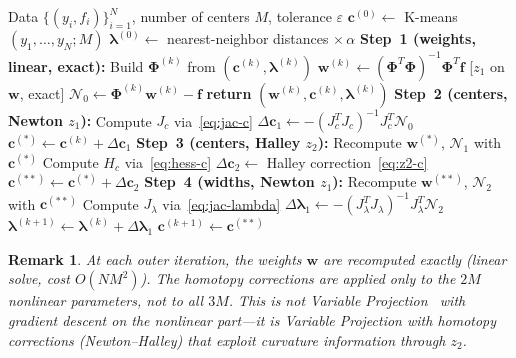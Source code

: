 \documentclass[11pt,a4paper]{article}
\newtheorem{remark}[theorem]{Remark}
\begin{document}
\begin{algorithm}[H]
\caption{HAM-RBF Identification}
\label{alg:identification}
\begin{algorithmic}[1]
\REQUIRE Data $\{(y_i, f_i)\}_{i=1}^N$, number of centers $M$, tolerance $\varepsilon$
\STATE $\mathbf{c}^{(0)} \leftarrow$ K-means$(y_1,\ldots,y_N; M)$
\STATE $\boldsymbol{\lambda}^{(0)} \leftarrow$ nearest-neighbor distances $\times\,\alpha$
    \STATE \textbf{Step~1 (weights, linear, exact):}
    \STATE \quad Build $\boldsymbol{\Phi}^{(k)}$ from $(\mathbf{c}^{(k)}, \boldsymbol{\lambda}^{(k)})$
    \STATE \quad $\mathbf{w}^{(k)} \leftarrow (\boldsymbol{\Phi}^T\boldsymbol{\Phi})^{-1}\boldsymbol{\Phi}^T\mathbf{f}$ \hfill [$z_1$ on $\mathbf{w}$, exact]
    \STATE \quad $\mathcal{N}_0 \leftarrow \boldsymbol{\Phi}^{(k)}\mathbf{w}^{(k)} - \mathbf{f}$
        \STATE \textbf{return} $(\mathbf{w}^{(k)}, \mathbf{c}^{(k)}, \boldsymbol{\lambda}^{(k)})$
    \ENDIF
    \STATE \textbf{Step~2 (centers, Newton $z_1$):}
    \STATE \quad Compute $J_c$ via~\eqref{eq:jac-c}
    \STATE \quad $\Delta\mathbf{c}_1 \leftarrow -(J_c^T J_c)^{-1}J_c^T\mathcal{N}_0$
    \STATE \quad $\mathbf{c}^{(*)} \leftarrow \mathbf{c}^{(k)} + \Delta\mathbf{c}_1$
    \STATE \textbf{Step~3 (centers, Halley $z_2$):}
    \STATE \quad Recompute $\mathbf{w}^{(*)}$, $\mathcal{N}_1$ with $\mathbf{c}^{(*)}$
    \STATE \quad Compute $H_c$ via~\eqref{eq:hess-c}
    \STATE \quad $\Delta\mathbf{c}_2 \leftarrow$ Halley correction~\eqref{eq:z2-c}
    \STATE \quad $\mathbf{c}^{(**)} \leftarrow \mathbf{c}^{(*)} + \Delta\mathbf{c}_2$
    \STATE \textbf{Step~4 (widths, Newton $z_1$):}
    \STATE \quad Recompute $\mathbf{w}^{(**)}$, $\mathcal{N}_2$ with $\mathbf{c}^{(**)}$
    \STATE \quad Compute $J_\lambda$ via~\eqref{eq:jac-lambda}
    \STATE \quad $\Delta\boldsymbol{\lambda}_1 \leftarrow -(J_\lambda^T J_\lambda)^{-1}J_\lambda^T\mathcal{N}_2$
    \STATE \quad $\boldsymbol{\lambda}^{(k+1)} \leftarrow \boldsymbol{\lambda}^{(k)} + \Delta\boldsymbol{\lambda}_1$
    \STATE \quad $\mathbf{c}^{(k+1)} \leftarrow \mathbf{c}^{(**)}$
\ENDFOR
\end{algorithmic}
\end{algorithm}

\begin{remark}
At each outer iteration, the weights $\mathbf{w}$ are recomputed exactly (linear solve, cost $O(NM^2)$). The homotopy corrections are applied only to the $2M$ nonlinear parameters, not to all $3M$. This is not Variable Projection~\cite{GolubPereyra1973} with gradient descent on the nonlinear part---it is Variable Projection with \emph{homotopy corrections} (Newton--Halley) that exploit curvature information through $z_2$.
\end{remark}
\end{document}
